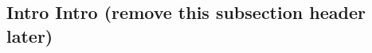 \documentclass[%
preprint,                                  %
nofootinbib,
 amsmath,amssymb,
 aps,
]{revtex4-1}
\begin{document}
\subsection{\label{sec:intro.intro}Intro Intro (remove this subsection header later)}






 



\end{document}
